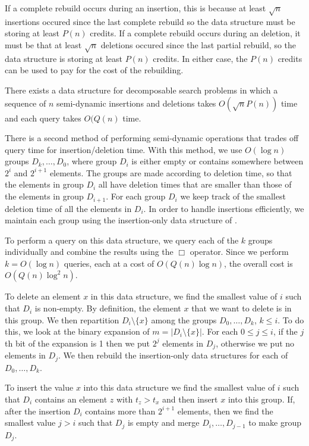 {If a complete rebuild occurs during an insertion, this is because at
least $\sqrt{n}$ insertions occured since the last complete rebuild so
the data structure must be storing at least $P(n)$ credits.  If a
complete rebuild occurs during an deletion, it must be that at least
$\sqrt{n}$ deletions occured since the last partial rebuild, so the
data structure is storing at least $P(n)$ credits.  In either case,
the $P(n)$ credits can be used to pay for the cost of the rebuilding.

\begin{thm}
There exists a data structure for decomposable search problems in
which a sequence of $n$ semi-dynamic insertions and deletions takes
$O(\sqrt{n}P(n))$ time and each query takes $O(Q(n)$ time.
\end{thm}

There is a second method of performing semi-dynamic operations that
trades off query time for insertion/deletion time.  With this method,
we use $O(\log n)$ groups $D_k,\ldots,D_0$, where group $D_i$ is
either empty or contains somewhere between $2^i$ and $2^{i+1}$
elements.  The groups are made according to deletion time, so that the
elements in group $D_i$ all have deletion times that are smaller than
those of the elements in group $D_{i+1}$.  For each group $D_i$ we
keep track of the smallest deletion time of all the elements in $D_i$.
In order to handle insertions efficiently, we maintain each group
using the insertion-only data structure of .

To perform a query on this data structure, we query each of the $k$
groups individually and combine the results using the $\Box$ operator.
Since we perform $k=O(\log n)$ queries, each at a cost of $O(Q(n)\log
n)$, the overall cost is $O(Q(n)\log^2 n)$.

To delete an element $x$ in this data structure, we find the smallest
value of $i$ such that $D_i$ is non-empty.  By definition, the element
$x$ that we want to delete is in this group.  We then repartition
$D_i\setminus\{x\}$ among the groups $D_0,\ldots,D_k$, $k\le i$.  To
do this, we look at the binary expansion of $m=|D_i\setminus\{x\}|$.
For each $0\le j\le i$, if the $j$th bit of the expansion is 1 then we
put $2^j$ elements in $D_j$, otherwise we put no elements in $D_j$.
We then rebuild the insertion-only data structures for each of
$D_0,\ldots,D_k$.

To insert the value $x$ into this data structure we find the smallest
value of $i$ such that $D_i$ contains an element $z$ with $t_z>t_x$
and then insert $x$ into this group.  If, after the insertion $D_i$
contains more than $2^{i+1}$ elements, then we find the smallest value
$j>i$ such that $D_j$ is empty and merge $D_i,\ldots,D_{j-1}$ to make
group $D_j$.

}
